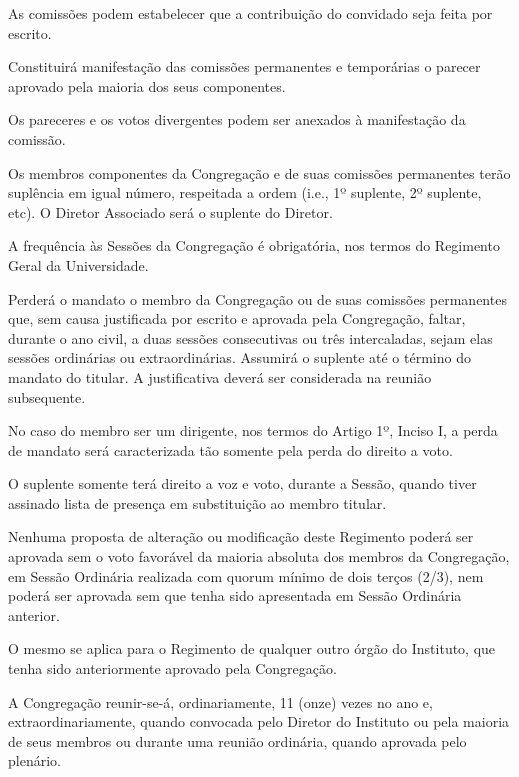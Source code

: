 \documentclass{documento}
\begin{document}
\paragrafounico As comissões podem estabelecer que a contribuição do convidado seja feita por escrito.

\artigo Constituirá manifestação das comissões permanentes e temporárias o parecer aprovado pela maioria dos seus componentes.

\paragrafounico Os pareceres e os votos divergentes podem ser anexados à manifestação da comissão.


\artigo Os membros componentes da Congregação e de suas comissões permanentes terão suplência em igual número, respeitada a ordem (i.e., 1º suplente, 2º suplente, etc). O Diretor Associado será o suplente do Diretor.

\artigo A frequência às Sessões da Congregação é obrigatória, nos termos do Regimento Geral da Universidade.

\paragrafo Perderá o mandato o membro da Congregação ou de suas comissões permanentes que, sem causa justificada por escrito e aprovada pela Congregação, faltar, durante o ano civil, a duas sessões consecutivas ou três intercaladas, sejam elas sessões ordinárias ou extraordinárias. Assumirá o suplente até o término do mandato do titular. A justificativa deverá ser considerada na reunião subsequente.

\paragrafo No caso do membro ser um dirigente, nos termos do Artigo 1º, Inciso I, a perda de mandato será caracterizada tão somente pela perda do direito a voto.

\paragrafo O suplente somente terá direito a voz e voto, durante a Sessão, quando tiver assinado lista de presença em substituição ao membro titular.

\artigo Nenhuma proposta de alteração ou modificação deste Regimento poderá ser aprovada sem o voto favorável da maioria absoluta dos membros da Congregação, em Sessão Ordinária realizada com quorum mínimo de dois terços (2/3), nem poderá ser aprovada sem que tenha sido apresentada em Sessão Ordinária anterior.

\paragrafounico O mesmo se aplica para o Regimento de qualquer outro órgão do Instituto, que tenha sido anteriormente aprovado pela Congregação.



\artigo A Congregação reunir-se-á, ordinariamente, 11 (onze) vezes no ano e, extraordinariamente, quando convocada pelo Diretor do Instituto ou pela maioria de seus membros ou durante uma reunião ordinária, quando aprovada pelo plenário.
\end{document}
